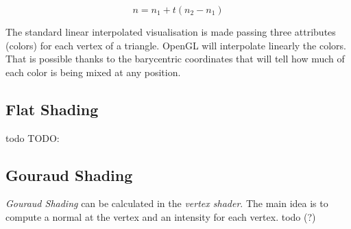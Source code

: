 $$ n = n_1 + t (n_2 - n_1)$$


The standard linear interpolated visualisation is made passing three attributes (colors) for each vertex of a triangle. OpenGL will interpolate linearly the colors. That is possible thanks to the barycentric coordinates that will tell how much of each color is being mixed at any position.


\subsection{Flat Shading}
todo
TODO:


\subsection{Gouraud Shading}
\textit{Gouraud Shading} can be calculated in the \textit{vertex shader}. The main idea is to compute a normal at the vertex and an intensity for each vertex.
todo (?)


